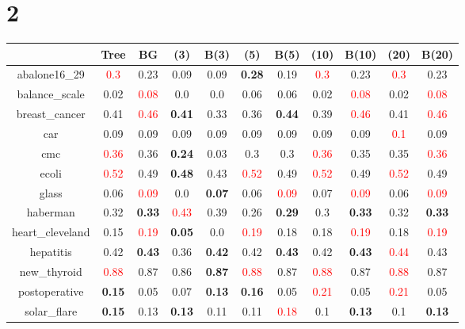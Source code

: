 \documentclass{article}%
\begin{document}
\section*{2}%
\begin{tabular}{c|cccccccccc}%
\hline%
&Tree&BG&(3)&B(3)&(5)&B(5)&(10)&B(10)&(20)&B(20)\\%
\hline%
abalone16\_29&\textcolor{red}{ 
0.3
}&0.23&0.09&0.09&\textbf{0.28}&0.19&\textcolor{red}{ 
0.3
}&0.23&\textcolor{red}{ 
0.3
}&0.23\\%
\hline%
balance\_scale&0.02&\textcolor{red}{ 
0.08
}&0.0&0.0&0.06&0.06&0.02&\textcolor{red}{ 
0.08
}&0.02&\textcolor{red}{ 
0.08
}\\%
\hline%
breast\_cancer&0.41&\textcolor{red}{ 
0.46
}&\textbf{0.41}&0.33&0.36&\textbf{0.44}&0.39&\textcolor{red}{ 
0.46
}&0.41&\textcolor{red}{ 
0.46
}\\%
\hline%
car&0.09&0.09&0.09&0.09&0.09&0.09&0.09&0.09&\textcolor{red}{ 
0.1
}&0.09\\%
\hline%
cmc&\textcolor{red}{ 
0.36
}&0.36&\textbf{0.24}&0.03&0.3&0.3&\textcolor{red}{ 
0.36
}&0.35&0.35&\textcolor{red}{ 
0.36
}\\%
\hline%
ecoli&\textcolor{red}{ 
0.52
}&0.49&\textbf{0.48}&0.43&\textcolor{red}{ 
0.52
}&0.49&\textcolor{red}{ 
0.52
}&0.49&\textcolor{red}{ 
0.52
}&0.49\\%
\hline%
glass&0.06&\textcolor{red}{ 
0.09
}&0.0&\textbf{0.07}&0.06&\textcolor{red}{ 
0.09
}&0.07&\textcolor{red}{ 
0.09
}&0.06&\textcolor{red}{ 
0.09
}\\%
\hline%
haberman&0.32&\textbf{0.33}&\textcolor{red}{ 
0.43
}&0.39&0.26&\textbf{0.29}&0.3&\textbf{0.33}&0.32&\textbf{0.33}\\%
\hline%
heart\_cleveland&0.15&\textcolor{red}{ 
0.19
}&\textbf{0.05}&0.0&\textcolor{red}{ 
0.19
}&0.18&0.18&\textcolor{red}{ 
0.19
}&0.18&\textcolor{red}{ 
0.19
}\\%
\hline%
hepatitis&0.42&\textbf{0.43}&0.36&\textbf{0.42}&0.42&\textbf{0.43}&0.42&\textbf{0.43}&\textcolor{red}{ 
0.44
}&0.43\\%
\hline%
new\_thyroid&\textcolor{red}{ 
0.88
}&0.87&0.86&\textbf{0.87}&\textcolor{red}{ 
0.88
}&0.87&\textcolor{red}{ 
0.88
}&0.87&\textcolor{red}{ 
0.88
}&0.87\\%
\hline%
postoperative&\textbf{0.15}&0.05&0.07&\textbf{0.13}&\textbf{0.16}&0.05&\textcolor{red}{ 
0.21
}&0.05&\textcolor{red}{ 
0.21
}&0.05\\%
\hline%
solar\_flare&\textbf{0.15}&0.13&\textbf{0.13}&0.11&0.11&\textcolor{red}{ 
0.18
}&0.1&\textbf{0.13}&0.1&\textbf{0.13}\\%

\end{tabular}
\end{document}
